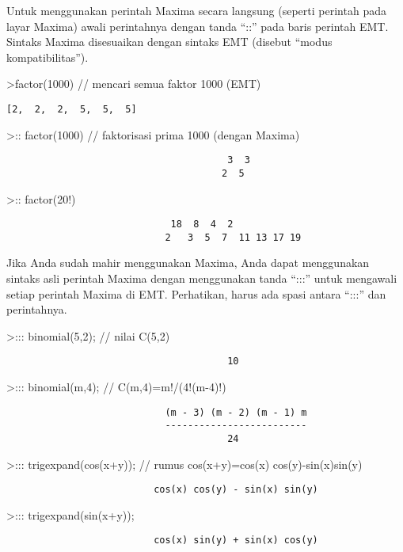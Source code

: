\documentclass[
]{book}
\begin{document}
Untuk menggunakan perintah Maxima secara langsung (seperti perintah pada layar Maxima) awali perintahnya dengan tanda ``::'' pada baris perintah EMT. Sintaks Maxima disesuaikan dengan sintaks EMT (disebut ``modus kompatibilitas'').

\textgreater factor(1000) // mencari semua faktor 1000 (EMT)

\begin{verbatim}
[2,  2,  2,  5,  5,  5]
\end{verbatim}

\textgreater:: factor(1000) // faktorisasi prima 1000 (dengan Maxima)

\begin{verbatim}
                                       3  3
                                      2  5
\end{verbatim}

\textgreater:: factor(20!)

\begin{verbatim}
                             18  8  4  2
                            2   3  5  7  11 13 17 19
\end{verbatim}

Jika Anda sudah mahir menggunakan Maxima, Anda dapat menggunakan sintaks asli perintah Maxima dengan menggunakan tanda ``:::'' untuk mengawali setiap perintah Maxima di EMT. Perhatikan, harus ada spasi antara ``:::'' dan perintahnya.

\textgreater::: binomial(5,2); // nilai C(5,2)

\begin{verbatim}
                                       10
\end{verbatim}

\textgreater::: binomial(m,4); // C(m,4)=m!/(4!(m-4)!)

\begin{verbatim}
                            (m - 3) (m - 2) (m - 1) m
                            -------------------------
                                       24
\end{verbatim}

\textgreater::: trigexpand(cos(x+y)); // rumus cos(x+y)=cos(x) cos(y)-sin(x)sin(y)

\begin{verbatim}
                          cos(x) cos(y) - sin(x) sin(y)
\end{verbatim}

\textgreater::: trigexpand(sin(x+y));

\begin{verbatim}
                          cos(x) sin(y) + sin(x) cos(y)
\end{verbatim}
\end{document}
